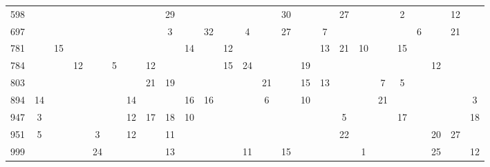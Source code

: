 \begin{table}[!t]
\begin{tabular}{@{}r|cccccccccccccccccccccccc@{}}
598 &    &    &    &    &    &    &    & 29 &    &    &    &    &    & 30 &    &    & 27 &    &    & 2  &    &    & 12 &    \\
697 &    &    &    &    &    &    &    & 3  &    & 32 &    & 4  &    & 27 &    & 7  &    &    &    &    & 6  &    & 21 &    \\
781 &    & 15 &    &    &    &    &    &    & 14 &    & 12 &    &    &    &    & 13 & 21 & 10 &    & 15 &    &    &    &    \\
784 &    &    & 12 &    & 5  &    & 12 &    &    &    & 15 & 24 &    &    & 19 &    &    &    &    &    &    & 12 &    &    \\
803 &    &    &    &    &    &    & 21 & 19 &    &    &    &    & 21 &    & 15 & 13 &    &    & 7  & 5  &    &    &    &    \\
894 & 14 &    &    &    &    & 14 &    &    & 16 & 16 &    &    & 6  &    & 10 &    &    &    & 21 &    &    &    &    & 3  \\
947 & 3  &    &    &    &    & 12 & 17 & 18 & 10 &    &    &    &    &    &    &    & 5  &    &    & 17 &    &    &    & 18 \\
951 & 5  &    &    & 3  &    & 12 &    & 11 &    &    &    &    &    &    &    &    & 22 &    &    &    &    & 20 & 27 &    \\
999 &    &    &    & 24 &    &    &    & 13 &    &    &    & 11 &    & 15 &    &    &    & 1  &    &    &    & 25 &    & 12 \\
\bottomrule
\end{tabular}
\end{table}

